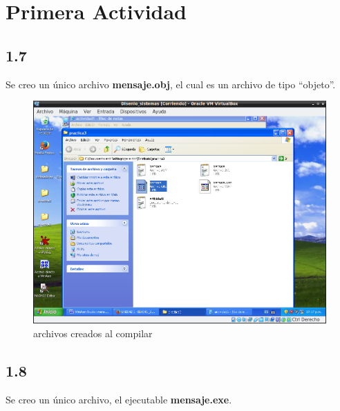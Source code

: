 \section{Primera Actividad}

\subsection*{1.7}
Se creo un único archivo \textbf{mensaje.obj}, el cual es un archivo de tipo ``objeto''.

\begin{figure}[H]
  \includegraphics[width=\linewidth]{practica3/imagenes/actividad1/creados_compilacion.png}
  \caption{archivos creados al compilar}
\end{figure}

\subsection*{1.8}
Se creo un único archivo, el ejecutable \textbf{mensaje.exe}.

